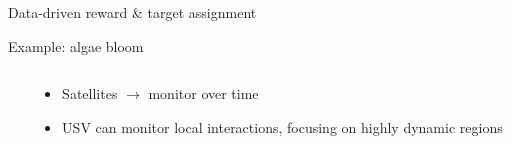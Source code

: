 \documentclass[9pt,xcolor=table]{beamer}
\begin{document}
\begin{frame}{Data-driven reward \& target assignment}
\begin{block}{Example: algae bloom}
\begin{columns}
\begin{column}{0.6\textwidth}
            \end{column}
            \begin{column}{0.55\textwidth}
                    \begin{itemize}
                        \item Satellites $\rightarrow$ monitor over time
                        \item USV can monitor local interactions, focusing on highly dynamic regions

                    \end{itemize}
            \end{column}            
        \end{columns}
    \end{block}
\end{frame}
\end{document}
